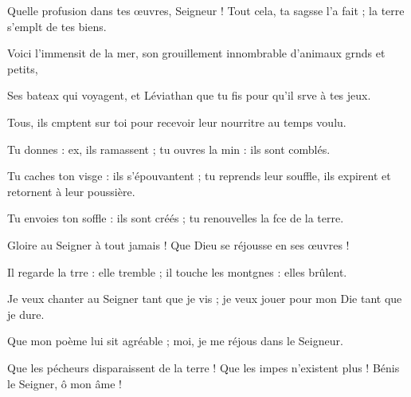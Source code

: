 \item Quelle profusion dans tes œuvres, Seigneur !\pscross{} Tout cela, ta sagsse l’a fait ;\psstar{} la terre s’emplt de tes biens.
\item Voici l’immensit de la mer,\psstar{} son grouillement innombrable d’animaux grnds et petits,
\item Ses bateax qui voyagent,\psstar{} et Léviathan que tu fis pour qu’il srve à tes jeux.
\item Tous, ils cmptent sur toi\psstar{} pour recevoir leur nourritre au temps voulu.
\item Tu donnes : ex, ils ramassent ;\psstar{} tu ouvres la min : ils sont comblés.
\item Tu caches ton visge : ils s’épouvantent ;\psstar{} tu reprends leur souffle, ils expirent et retornent à leur poussière.
\item Tu envoies ton soffle : ils sont créés ;\psstar{} tu renouvelles la fce de la terre.
\item Gloire au Seigner à tout jamais !\psstar{} Que Dieu se réjousse en ses œuvres !
\item Il regarde la trre : elle tremble ;\psstar{} il touche les montgnes : elles brûlent.
\item Je veux chanter au Seigner tant que je vis ;\psstar{} je veux jouer pour mon Die tant que je dure.
\item Que mon poème lui sit agréable ;\psstar{} moi, je me réjous dans le Seigneur.
\item Que les pécheurs disparaissent de la terre !\pscross{} Que les impes n’existent plus !\psstar{} Bénis le Seigner, ô mon âme !